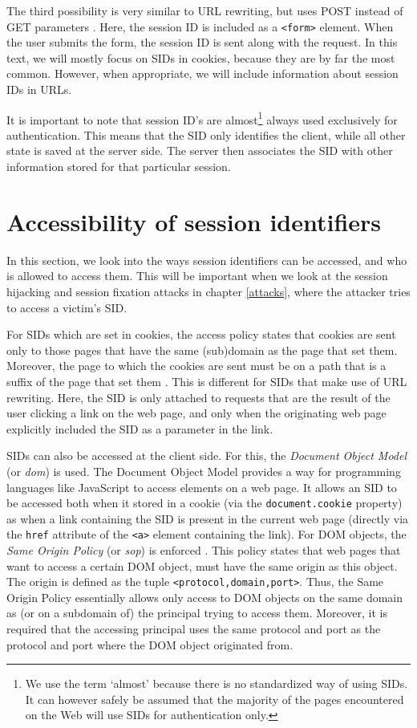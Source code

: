 The third possibility is very similar to URL rewriting, but uses POST instead of GET parameters \cite{Johns2006}. Here, the session ID is included as a \texttt{<form>} element. When the user submits the form, the session ID is sent along with the request. In this text, we will mostly focus on SIDs in cookies, because they are by far the most common. However, when appropriate, we will include information about session IDs in URLs.

It is important to note that session ID's are almost\footnote{We use the term `almost' because there is no standardized way of using SIDs. It can however safely be assumed that the majority of the pages encountered on the Web will use SIDs for authentication only.} always used exclusively for authentication. This means that the SID only identifies the client, while all other state is saved at the server side. The server then associates the SID with other information stored for that particular session.

\section{Accessibility of session identifiers}

In this section, we look into the ways session identifiers can be accessed, and who is allowed to access them. This will be important when we look at the \gls{session hijacking} and \gls{session fixation} attacks in chapter \ref{attacks}, where the attacker tries to access a victim's SID.

\label{access-control}For SIDs which are set in cookies, the access policy states that cookies are sent only to those pages that have the same (sub)domain as the page that set them. Moreover, the page to which the cookies are sent must be on a path that is a suffix of the page that set them \cite{Singh2010}. This is different for SIDs that make use of URL rewriting. Here, the SID is only attached to requests that are the result of the user clicking a link on the web page, and only when the originating web page explicitly included the SID as a parameter in the link.

\label{sop}SIDs can also be accessed at the client side. For this, the \emph{Document Object Model} (or \emph{\gls{dom}}) is used. The Document Object Model provides a way for programming languages like JavaScript to access elements on a web page. It allows an SID to be accessed both when it stored in a cookie (via the \texttt{document.cookie} property) as when a link containing the SID is present in the current web page (directly via the \texttt{href} attribute of the \texttt{<a>} element containing the link). For DOM objects, the \emph{Same Origin Policy} (or \emph{\gls{sop}}) is enforced \cite{Singh2010}. This policy states that web pages that want to access a certain DOM object, must have the same origin as this object. The origin is defined as the tuple \texttt{<protocol,domain,port>}. Thus, the Same Origin Policy essentially allows only access to DOM objects on the same domain as (or on a subdomain of) the principal trying to access them. Moreover, it is required that the accessing principal uses the same protocol and port as the protocol and port where the DOM object originated from.

